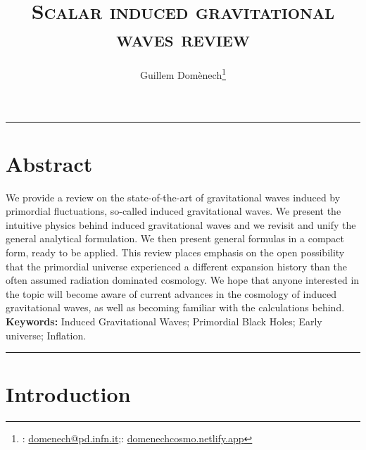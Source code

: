 \documentclass[a4paper,11pt]{article}
\title{\bf\textsc{Scalar induced gravitational waves review}}
\author[$\ddagger$\orcidA{}]{Guillem Dom{\`e}nech\footnote{\faEnvelope: \href{mailto:domenech@pd.infn.it}{domenech@pd.infn.it}\quad;\quad \faHome: \href{https://domenechcosmo.netlify.app}{domenechcosmo.netlify.app}}}
\affil[$\ddagger$]{INFN Sezione di Padova, I-35131 Padova, Italy}
\numberwithin{equation}{section}
\begin{document}
\clearpage\maketitle
\thispagestyle{empty}

\hrule
\section*{Abstract}
We provide a review on the state-of-the-art of gravitational waves induced by primordial fluctuations, so-called induced gravitational waves. We present the intuitive physics behind induced gravitational waves and we revisit and unify the general analytical formulation. We then present general formulas in a compact form, ready to be applied. This review places emphasis on the open possibility that the primordial universe experienced a different expansion history than the often assumed radiation dominated cosmology. We hope that anyone interested in the topic will become aware of current advances in the cosmology of induced gravitational waves, as well as becoming familiar with the calculations behind.\\

\noindent\textbf{Keywords:} Induced Gravitational Waves; Primordial Black Holes; Early universe; Inflation.\\

\hrule

\vspace*{5mm}

\tableofcontents




\section{Introduction \label{sec:intro}}
\end{document}
